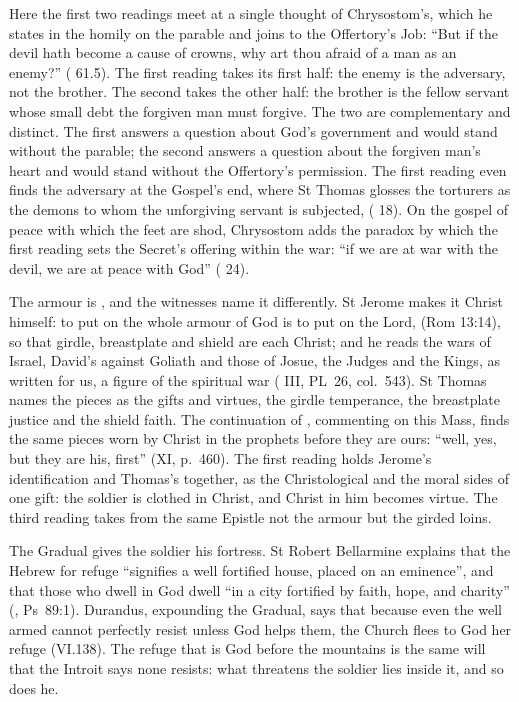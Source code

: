 Here the first two readings meet at a single thought of Chrysostom's, which he
states in the homily on the parable and joins to the Offertory's Job: ``But if
the devil hath become a cause of crowns, why art thou afraid of a man as an
enemy?'' ( 61.5). The first reading takes its first
half: the enemy is the adversary, not the brother. The second takes the other
half: the brother is the fellow servant whose small debt the forgiven man must
forgive. The two are complementary and distinct. The first answers a question
about God's government and would stand without the parable; the second answers
a question about the forgiven man's heart and would stand without the
Offertory's permission. The first reading even finds the adversary at the
Gospel's end, where St Thomas glosses the torturers as the demons to whom the
unforgiving servant is subjected,  ( 18). On the gospel of peace with which the feet are shod, Chrysostom
adds the paradox by which the first reading sets the Secret's offering within the
war: ``if we are at war
with the devil, we are at peace with God'' ( 24).

The armour is , and the witnesses name it differently. St
Jerome makes it Christ himself: to put on the whole armour of God is to put on
the Lord,  (Rom 13:14), so
that girdle, breastplate and shield are each Christ; and he reads the wars of
Israel, David's against Goliath and those of Josue, the Judges and the Kings, as
written for us, a figure of the spiritual war ( III, PL~26,
col.~543). St Thomas names the pieces as the gifts and virtues, the girdle
temperance, the breastplate justice and the shield faith. The continuation of
, commenting on this Mass, finds the same pieces worn by
Christ in the prophets before they are ours: ``well, yes, but they are his,
first'' (XI, p.~460). The first reading holds Jerome's identification and
Thomas's together, as the Christological and the moral sides of one gift: the
soldier is clothed in Christ, and Christ in him becomes virtue. The third reading
takes from the same Epistle not the armour but the girded loins.

The Gradual gives the soldier his fortress. St Robert Bellarmine explains that
the Hebrew for refuge ``signifies a well fortified house, placed on an
eminence'', and that those who dwell in God dwell ``in a city fortified by
faith, hope, and charity'' (, Ps~89:1).
Durandus, expounding the Gradual, says that because even the well armed cannot
perfectly resist unless God helps them, the Church flees to God her refuge
(VI.138). The refuge that is God before the mountains is the same will that the
Introit says none resists: what threatens the soldier lies inside it, and so
does he.

